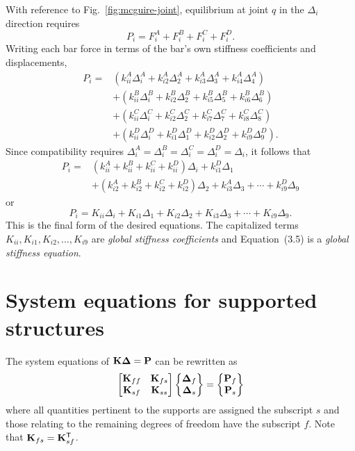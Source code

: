 With reference to Fig.~\ref{fig:mcguire-joint}, equilibrium at joint $q$ in the $\Delta_i$ direction requires
\begin{equation}
  P_i = F_i^A + F_i^B + F_i^C + F_i^D. \tag{3.2}
\end{equation}
Writing each bar force in terms of the bar's own stiffness coefficients and displacements,
\begin{equation}
  \begin{aligned}
    P_i ={}& (k_{ii}^A\Delta_i^A + k_{i2}^A\Delta_2^A + k_{i3}^A\Delta_3^A + k_{i4}^A\Delta_4^A)\\
          &+ (k_{ii}^B\Delta_i^B + k_{i2}^B\Delta_2^B + k_{i5}^B\Delta_5^B + k_{i6}^B\Delta_6^B)\\
          &+ (k_{ii}^C\Delta_i^C + k_{i2}^C\Delta_2^C + k_{i7}^C\Delta_7^C + k_{i8}^C\Delta_8^C)\\
          &+ (k_{ii}^D\Delta_i^D + k_{i1}^D\Delta_1^D + k_{i2}^D\Delta_2^D + k_{i9}^D\Delta_9^D).
  \end{aligned} \tag{3.3}
\end{equation}
Since compatibility requires $\Delta_i^A = \Delta_i^B = \Delta_i^C = \Delta_i^D = \Delta_i$, it follows that
\begin{equation}
  \begin{aligned}
    P_i ={}& (k_{ii}^A + k_{ii}^B + k_{ii}^C + k_{ii}^D)\Delta_i + k_{i1}^D\Delta_1\\
          &+ (k_{i2}^A + k_{i2}^B + k_{i2}^C + k_{i2}^D)\Delta_2 + k_{i3}^A\Delta_3 + \cdots + k_{i9}^D\Delta_9
  \end{aligned} \tag{3.4}
\end{equation}
or
\begin{equation}
  P_i = K_{ii}\Delta_i + K_{i1}\Delta_1 + K_{i2}\Delta_2 + K_{i3}\Delta_3 + \cdots + K_{i9}\Delta_9. \tag{3.5}
\end{equation}
This is the final form of the desired equations. The capitalized terms $K_{ii}, K_{i1}, K_{i2},\dots,K_{i9}$ are \emph{global stiffness coefficients} and Equation~(3.5) is a \emph{global stiffness equation}.

\section{System equations for supported structures}
The system equations of $\mathbf{K}\bm{\Delta} = \mathbf{P}$ can be rewritten as
\begin{equation}
  \begin{bmatrix}\mathbf{K}_{ff} & \mathbf{K}_{fs}\\ \mathbf{K}_{sf} & \mathbf{K}_{ss}\end{bmatrix}\begin{Bmatrix}\bm{\Delta}_f\\ \bm{\Delta}_s\end{Bmatrix} = \begin{Bmatrix}\mathbf{P}_f\\ \mathbf{P}_s\end{Bmatrix}
\end{equation}
where all quantities pertinent to the supports are assigned the subscript $s$ and those relating to the remaining degrees of freedom have the subscript $f$. Note that $\mathbf{K}_{fs} = \mathbf{K}_{sf}^{\mathsf{T}}$.

